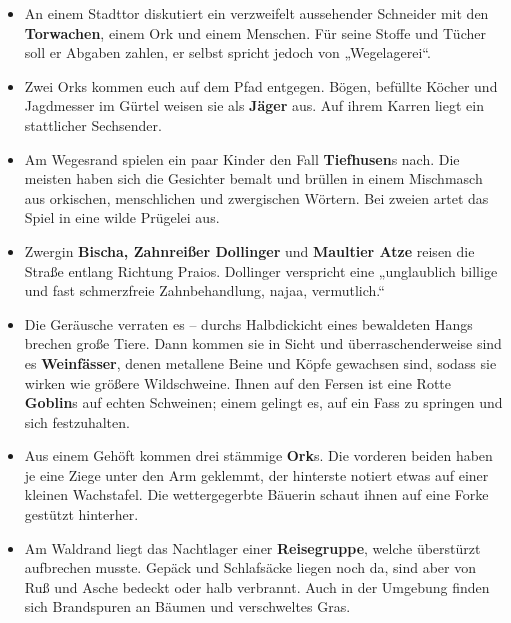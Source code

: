 \begin{itemize}
\item An einem Stadttor diskutiert ein verzweifelt aussehender Schneider mit den \textbf{Torwachen}, einem Ork und einem Menschen. Für seine Stoffe und Tücher soll er Abgaben zahlen, er selbst spricht jedoch von „Wegelagerei“.

\item Zwei Orks kommen euch auf dem Pfad entgegen. Bögen, befüllte Köcher und Jagdmesser im Gürtel weisen sie als \textbf{Jäger} aus. Auf ihrem Karren liegt ein stattlicher Sechsender.

\item Am Wegesrand spielen ein paar Kinder den Fall \textbf{Tiefhusen}s nach. Die meisten haben sich die Gesichter bemalt und brüllen in einem Mischmasch aus orkischen, menschlichen und zwergischen Wörtern. Bei zweien artet das Spiel in eine wilde Prügelei aus.

\item Zwergin \textbf{Bischa, Zahnreißer Dollinger} und \textbf{Maultier Atze} reisen die Straße entlang Richtung Praios. Dollinger verspricht eine „unglaublich billige und fast schmerzfreie Zahnbehandlung, najaa, vermutlich.“

\item Die Geräusche verraten es -- durchs Halbdickicht eines bewaldeten Hangs brechen große Tiere.
Dann kommen sie in Sicht und überraschenderweise sind es \textbf{Weinfässer}, denen metallene Beine und Köpfe gewachsen sind, sodass sie wirken wie größere Wildschweine.
Ihnen auf den Fersen ist eine Rotte \textbf{Goblin}s auf echten Schweinen; einem gelingt es, auf ein Fass zu springen und sich festzuhalten.

\item Aus einem Gehöft kommen drei stämmige \textbf{Ork}s.
Die vorderen beiden haben je eine Ziege unter den Arm geklemmt, der hinterste notiert etwas auf einer kleinen Wachstafel.
Die wettergegerbte Bäuerin schaut ihnen auf eine Forke gestützt hinterher.

\item Am Waldrand liegt das Nachtlager einer \textbf{Reisegruppe}, welche überstürzt aufbrechen musste.
Gepäck und Schlafsäcke liegen noch da, sind aber von Ruß und Asche bedeckt oder halb verbrannt.
Auch in der Umgebung finden sich Brandspuren an Bäumen und verschweltes Gras. 
\end{itemize}
\begin{center}
\end{center}

